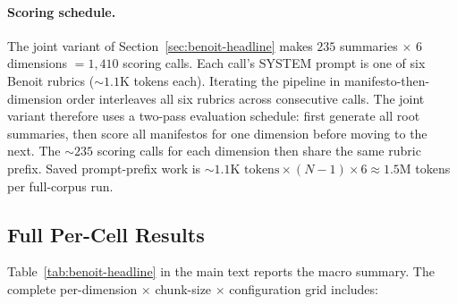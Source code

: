 \paragraph{Scoring schedule.} The joint variant of
Section~\ref{sec:benoit-headline} makes $235$ summaries $\times$ $6$
dimensions $= 1{,}410$ scoring calls. Each call's SYSTEM prompt is
one of six Benoit rubrics ($\sim\!1.1$K tokens each). Iterating the
pipeline in manifesto-then-dimension order
interleaves all six rubrics across consecutive calls. The joint variant
therefore uses a two-pass evaluation schedule: first generate all root
summaries, then score all manifestos for one dimension before moving to
the next. The $\sim\!235$ scoring calls for each dimension then share
the same rubric prefix. Saved prompt-prefix work is
$\sim\!1.1\text{K tokens} \times (N-1) \times 6
\approx 1.5$M tokens per full-corpus run.

\subsection{Full Per-Cell Results}

Table~\ref{tab:benoit-headline} in the main text reports the macro
summary. The complete per-dimension $\times$ chunk-size $\times$
configuration grid includes:

